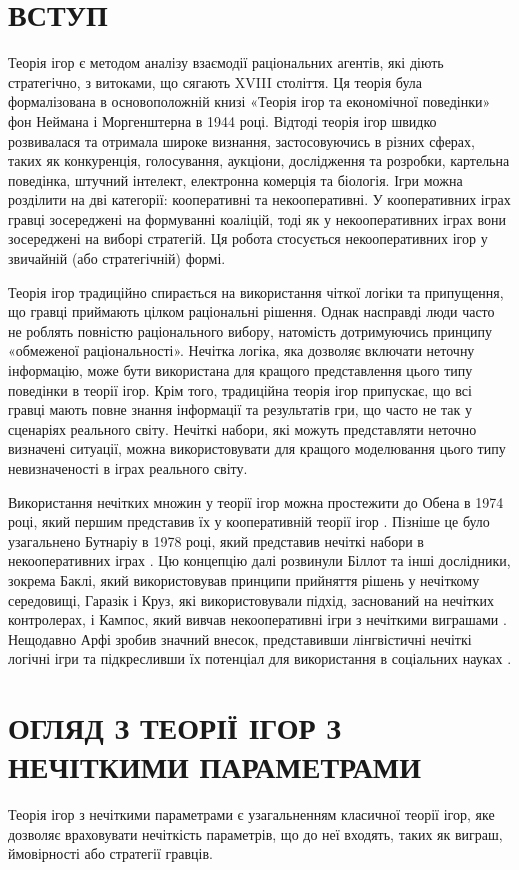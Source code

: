 \documentclass[14pt, a4paper, oneside]{extarticle}
\numberwithin{equation}{section}
\begin{document}
\section*{ВСТУП}
Теорія ігор є методом аналізу взаємодії раціональних агентів, які діють стратегічно, з витоками, що сягають XVIII століття. Ця теорія була формалізована в основоположній книзі «Теорія ігор та економічної поведінки» фон Неймана і Моргенштерна в 1944 році. Відтоді теорія ігор швидко розвивалася та отримала широке визнання, застосовуючись в різних сферах, таких як конкуренція, голосування, аукціони, дослідження та розробки, картельна поведінка, штучний інтелект, електронна комерція та біологія. Ігри можна розділити на дві категорії: кооперативні та некооперативні. У кооперативних іграх гравці зосереджені на формуванні коаліцій, тоді як у некооперативних іграх вони зосереджені на виборі стратегій. Ця робота стосується некооперативних ігор у звичайній (або стратегічній) формі.

Теорія ігор традиційно спирається на використання чіткої логіки та припущення, що гравці приймають цілком раціональні рішення. Однак насправді люди часто не роблять повністю раціонального вибору, натомість дотримуючись принципу «обмеженої раціональності». Нечітка логіка, яка дозволяє включати неточну інформацію, може бути використана для кращого представлення цього типу поведінки в теорії ігор. Крім того, традиційна теорія ігор припускає, що всі гравці мають повне знання інформації та результатів гри, що часто не так у сценаріях реального світу. Нечіткі набори, які можуть представляти неточно визначені ситуації, можна використовувати для кращого моделювання цього типу невизначеності в іграх реального світу.

Використання нечітких множин у теорії ігор можна простежити до Обена в 1974 році, який першим представив їх у кооперативній теорії ігор \cite{Owen}. Пізніше це було узагальнено Бутнаріу в 1978 році, який представив нечіткі набори в некооперативних іграх \cite{Butnariu}. Цю концепцію далі розвинули Біллот та інші дослідники, зокрема Баклі, який використовував принципи прийняття рішень у нечіткому середовищі, Гаразік і Круз, які використовували підхід, заснований на нечітких контролерах, і Кампос, який вивчав некооперативні ігри з нечіткими виграшами \cite{Buckley}. Нещодавно Арфі зробив значний внесок, представивши лінгвістичні нечіткі логічні ігри та підкресливши їх потенціал для використання в соціальних науках \cite{Arfi}.


\section{ОГЛЯД З ТЕОРІЇ ІГОР З НЕЧІТКИМИ ПАРАМЕТРАМИ}
Теорія ігор з нечіткими параметрами є узагальненням класичної теорії ігор, яке дозволяє враховувати нечіткість параметрів, що до неї входять, таких як виграш, ймовірності або стратегії гравців.
\end{document}
